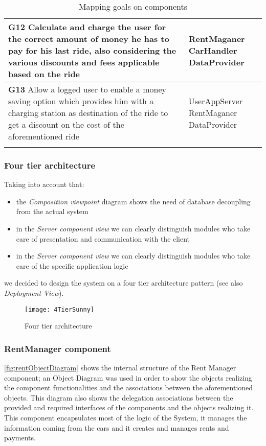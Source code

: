 \begin{longtable}{p{0.7\linewidth}p{0.3\linewidth}}
\midrule
\textbf{G12} Calculate and charge the user for the correct amount of money he has to pay for his last ride, also considering the various discounts and fees applicable based on the ride & \mbox{RentMaganer} \mbox{CarHandler} \mbox{DataProvider}\\
\midrule
\textbf{G13} Allow a logged user to enable a money saving option which provides him with a charging station as destination of the ride to get a discount on the cost of the aforementioned ride & \mbox{UserAppServer} \mbox{RentMaganer} \mbox{DataProvider}\\
\midrule
\bottomrule
\caption{Mapping goals on components}
\end{longtable}

\subsubsection{Four tier architecture}
Taking into account that:
\begin{itemize}
	\item the \emph{Composition viewpoint} diagram shows the need of database decoupling from the actual system
	\item in the \emph{Server component view} we can clearly distinguish modules who take care of presentation and communication with the client
	\item in the \emph{Server component view} we can clearly distinguish modules who take care of the specific application logic
\end{itemize}
we decided to design the system on a four tier architecture pattern (see also \emph{Deployment View}). 
	
\begin{figure}[h]
	\centering
	\texttt{[image: 4TierSunny]}
	\caption{
		\label{fig:fourTier} 
		Four tier architecture
	}
\end{figure}
		
\subsubsection{RentManager component}

\autoref{fig:rentObjectDiagram} shows the internal structure of the Rent Manager component; an Object Diagram was used in order to show the objects realizing the component functionalities and the associations between the aforementioned objects. This diagram also shows the delegation associations between the provided and required interfaces of the components and the objects realizing it.
\\
This component encapsulates most of the logic of the System, it manages the information coming from the cars and it creates and manages rents and payments. 

